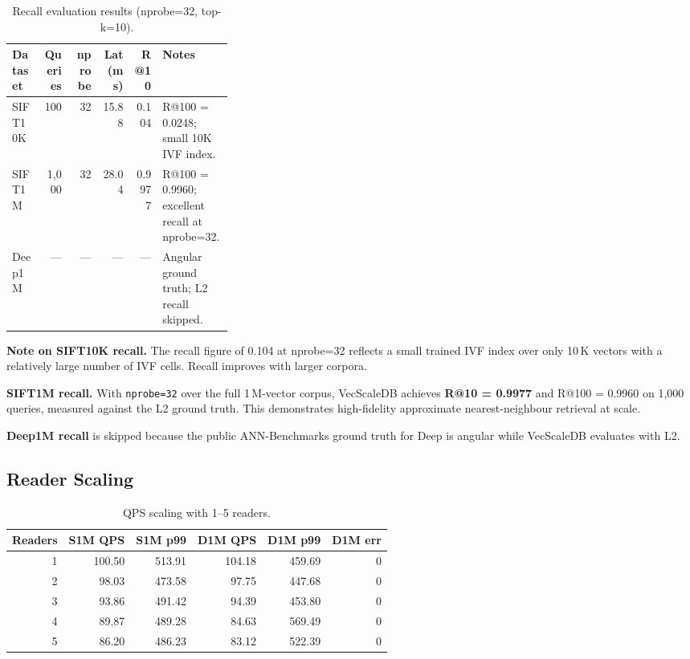 \documentclass[11pt,a4paper]{article}
\begin{document}
\begin{table}[H]
\centering
\caption{Recall evaluation results (nprobe=32, top-k=10).}
\renewcommand{\arraystretch}{1.2}
\begin{tabular}{lrrrr p{0.32\linewidth}}
\toprule
\textbf{Dataset} & \textbf{Queries} & \textbf{nprobe} &
\textbf{Lat (ms)} & \textbf{R@10} & \textbf{Notes} \\
\midrule
SIFT10K & 100   & 32 & 15.88 & 0.104  & R@100 = 0.0248; small 10K IVF index. \\
SIFT1M  & 1,000 & 32 & 28.04 & 0.9977 & R@100 = 0.9960; excellent recall at nprobe=32. \\
Deep1M  & ---   & --- & ---   & ---    & Angular ground truth; L2 recall skipped. \\
\bottomrule
\end{tabular}
\end{table}

\begin{infobox}
\textbf{Note on SIFT10K recall.} The recall figure of 0.104 at nprobe=32
reflects a small trained IVF index over only 10\,K vectors with a relatively
large number of IVF cells. Recall improves with larger corpora.

\textbf{SIFT1M recall.} With \texttt{nprobe=32} over the full 1\,M-vector
corpus, VecScaleDB achieves \textbf{R@10 = 0.9977} and R@100 = 0.9960 on
1,000 queries, measured against the L2 ground truth. This demonstrates
high-fidelity approximate nearest-neighbour retrieval at scale.

\textbf{Deep1M recall} is skipped because the public ANN-Benchmarks ground
truth for Deep is angular while VecScaleDB evaluates with L2.
\end{infobox}

\subsection{Reader Scaling}

\begin{table}[H]
\centering
\caption{QPS scaling with 1–5 readers.}
\renewcommand{\arraystretch}{1.2}
\setlength{\tabcolsep}{6pt}
\begin{tabular}{rrrrrr}
\toprule
\textbf{Readers} & \textbf{S1M QPS} & \textbf{S1M p99} &
\textbf{D1M QPS} & \textbf{D1M p99} & \textbf{D1M err} \\
\midrule
1 & 100.50 & 513.91 & 104.18 & 459.69 & 0 \\
2 & 98.03  & 473.58 & 97.75  & 447.68 & 0 \\
3 & 93.86  & 491.42 & 94.39  & 453.80 & 0 \\
4 & 89.87  & 489.28 & 84.63  & 569.49 & 0 \\
5 & 86.20  & 486.23 & 83.12  & 522.39 & 0 \\
\bottomrule
\end{tabular}
\end{table}
\end{document}

